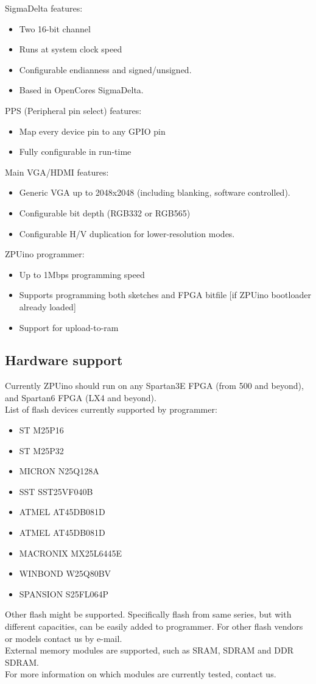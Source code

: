 SigmaDelta features:
\begin{itemize}
\item Two 16-bit channel
\item Runs at system clock speed
\item Configurable endianness and signed/unsigned.
\item Based in OpenCores SigmaDelta.
\end{itemize}

PPS (Peripheral pin select) features:
\begin{itemize}
\item Map every device pin to any GPIO pin
\item Fully configurable in run-time
\end{itemize}

Main VGA/HDMI features:
\begin{itemize}
\item Generic VGA up to 2048x2048 (including blanking, software controlled).
\item Configurable bit depth (RGB332 or RGB565)
\item Configurable H/V duplication for lower-resolution modes.
\end{itemize}

ZPUino programmer:
\begin{itemize}
\item Up to 1Mbps programming speed
\item Supports programming both sketches and FPGA bitfile [if ZPUino bootloader already loaded]
\item Support for upload-to-ram
\end{itemize}

\subsection{Hardware support}

Currently ZPUino should run on any Spartan3E FPGA (from 500 and beyond), and Spartan6 FPGA (LX4 and beyond). \\
List of flash devices currently supported by programmer:
\begin{itemize}
\item ST M25P16
\item ST M25P32
\item MICRON N25Q128A
\item SST SST25VF040B
\item ATMEL AT45DB081D
\item ATMEL AT45DB081D
\item MACRONIX MX25L6445E
\item WINBOND W25Q80BV
\item SPANSION S25FL064P
\end{itemize}
Other flash might be supported. Specifically flash from same series, but with different capacities, can be easily added to programmer.
For other flash vendors or models contact us by e-mail. \\
External memory modules are supported, such as SRAM, SDRAM and DDR SDRAM.\\
For more information on which modules are currently tested, contact us.

